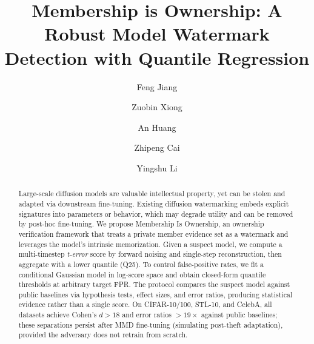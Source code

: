 \documentclass[sigconf, review, anonymous]{acmart}
\begin{document}
\title[Membership is Ownership]{Membership is Ownership: A Robust Model Watermark Detection with Quantile Regression}

\author{Feng Jiang}

\author{Zuobin Xiong}

\author{An Huang}

\author{Zhipeng Cai}

\author{Yingshu Li}

\renewcommand{\shortauthors}{Jiang et al.}

\begin{abstract}
Large-scale diffusion models are valuable intellectual property, yet can be stolen and adapted via downstream fine-tuning.
Existing diffusion watermarking embeds explicit signatures into parameters or behavior, which may degrade utility and can be removed by post-hoc fine-tuning.
We propose {Membership Is Ownership}, an ownership verification framework that treats a private member evidence set as a watermark and leverages the model's intrinsic memorization.
Given a suspect model, we compute a multi-timestep \emph{t-error} score by forward noising and single-step reconstruction, then aggregate with a lower quantile (Q25).
To control false-positive rates, we fit a conditional Gaussian model in log-score space and obtain closed-form quantile thresholds at arbitrary target FPR.
The protocol compares the suspect model against public baselines via hypothesis tests, effect sizes, and error ratios, producing statistical evidence rather than a single score.
On CIFAR-10/100, STL-10, and CelebA, all datasets achieve Cohen's $d > 18$ and error ratios $> 19\times$ against public baselines; these separations persist after MMD fine-tuning (simulating post-theft adaptation), provided the adversary does not retrain from scratch.
\end{abstract}
\end{document}
